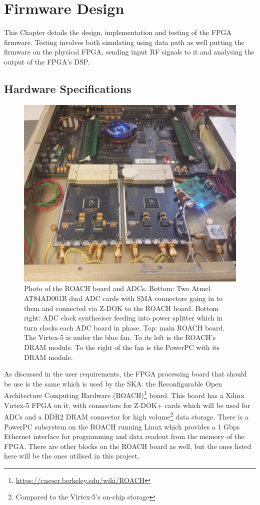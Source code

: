 \chapter{Firmware Design}
\label{ch:firmware-design}
\graphicspath{{./img/firmware/}}

This Chapter details the design, implementation and testing of the FPGA firmware. Testing involves both simulating using data path as well putting the firmware on the physical FPGA, sending input RF signals to it and analysing the output of the FPGA's DSP.

\section{Hardware Specifications}

\begin{figure}
  \centering
  \includegraphics[width=\textwidth]{roach-photo}
  \caption{Photo of the ROACH board and ADCs. Bottom: Two Atmel AT84AD001B dual ADC cards with SMA connectors going in to them and connected via Z-DOK to the ROACH board. Bottom right: ADC clock synthesiser feeding into power splitter which in turn clocks each ADC board in phase. Top: main ROACH board. The Virtex-5 is under the blue fan. To its left is the ROACH's DRAM module. To the right of the fan is the PowerPC with its DRAM module.}
  \label{fig:firmware:roach-photo}
\end{figure}

As discussed in the user requirements, the FPGA processing board that should be use is the same which is used by the SKA: the Reconfigurable Open Architecture Computing Hardware (ROACH)\footnote{\url{https://casper.berkeley.edu/wiki/ROACH}} board. This board has a Xilinx Virtex-5 FPGA on it, with connectors for Z-DOK+ cards which will be used for ADCs and a DDR2 DRAM connector for high volume\footnote{Compared to the Virtex-5's on-chip storage} data storage. There is a PowerPC subsystem on the ROACH running Linux which provides a 1 Gbps Ethernet interface for programming and data readout from the memory of the FPGA. There are other blocks on the ROACH board as well, but the ones listed here will be the ones utilised in this project.

